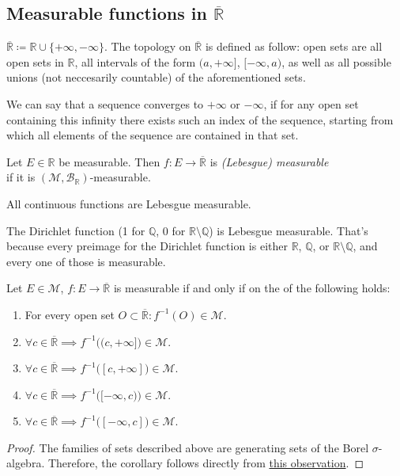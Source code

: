 \subsection{Measurable functions in $\overline{\mathbb{R}}$}
\begin{definition}
    $\overline{\mathbb{R}} \coloneqq \mathbb{R} \cup \{+\infty, -\infty\}$.
    The topology on $\overline{\mathbb{R}}$ is defined as follow:
    open sets are all open sets in $\mathbb{R}$, all intervals of the form
    $(a, +\infty]$, $[-\infty, a)$, as well as all possible unions (not neccesarily countable)
    of the aforementioned sets.
\end{definition}
\begin{definition}
    We can say that a sequence converges to $+\infty$ or $-\infty$, if for any open set
    containing this infinity there exists such an index of the sequence, 
    starting from which all elements of the sequence are contained in that set.
\end{definition}
\begin{definition}
    Let $E \in \mathbb{R}$ be measurable. Then $f : E \to \overline{\mathbb{R}}$
    is \textit{(Lebesgue) measurable}\\ if it is $(\mathcal{M}, \mathcal{B}_\mathbb{R})$-measurable.
\end{definition}
\begin{example}[1]
    All continuous functions are Lebesgue measurable.
\end{example}
\begin{example}[2]
    The Dirichlet function (1 for $\mathbb{Q}$, 0 for $\mathbb{R} \setminus \mathbb{Q}$)
    is Lebesgue measurable. 
    That's because every preimage for the Dirichlet function
    is either $\mathbb{R}$, $\mathbb{Q}$, or $\mathbb{R} \setminus \mathbb{Q}$, and
    every one of those is measurable.
\end{example}
\begin{corollary}
    Let $E \in \mathcal{M}$, $f : E \to \overline{\mathbb{R}}$ is measurable if and only
    if on the of the following holds:
    \begin{enumerate}
        \item {
            For every open set $O \subset \overline{\mathbb{R}}: f^{-1}(O) \in \mathcal{M}$.
        }
        \item {
            $\forall c \in \overline{\mathbb{R}} \implies
            f^{-1}\bigl((c, +\infty]\bigr) \in \mathcal{M}$.
        }
        \item {
            $\forall c \in \overline{\mathbb{R}} \implies
            f^{-1}\bigl([c, +\infty]\bigr) \in \mathcal{M}$.
        }
        \item {
            $\forall c \in \overline{\mathbb{R}} \implies
            f^{-1}\bigl([-\infty, c)\bigr) \in \mathcal{M}$.
        }
        \item {
            $\forall c \in \overline{\mathbb{R}} \implies
            f^{-1}\bigl([-\infty, c]\bigr) \in \mathcal{M}$.
        }
    \end{enumerate}
\end{corollary}
\begin{proof}
    The families of sets described above are generating sets of the Borel $\sigma$-algebra.
    Therefore, the corollary follows directly from \hyperref[obs:contains_generating_set]{this observation}.
\end{proof}
